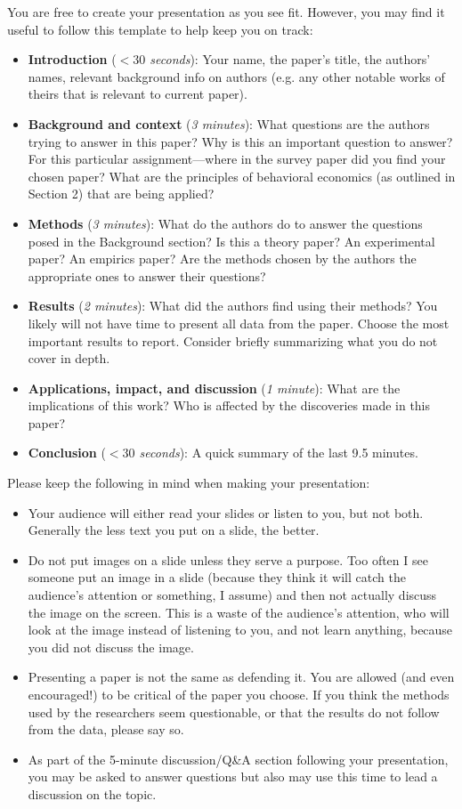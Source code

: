 \documentclass[11pt]{article}
\begin{document}
You are free to create your presentation as you see fit. However, you may find it useful to follow this template to help keep you on track:
\begin{itemize}
    \item {\bf Introduction} ({\it $<30$ seconds}): Your name, the paper's title, the authors' names, relevant background info on authors (e.g. any other notable works of theirs that is relevant to current paper).
    \item {\bf Background and context} ({\it 3 minutes}): What questions are the authors trying to answer in this paper? Why is this an important question to answer? For this particular assignment---where in the survey paper did you find your chosen paper? What are the principles of behavioral economics (as outlined in Section 2) that are being applied?
    \item {\bf Methods} ({\it 3 minutes}): What do the authors do to answer the questions posed in the Background section? Is this a theory paper? An experimental paper? An empirics paper? Are the methods chosen by the authors the appropriate ones to answer their questions? 
    \item {\bf Results} ({\it 2 minutes}): What did the authors find using their methods? You likely will not have time to present all data from the paper. Choose the most important results to report. Consider briefly summarizing what you do not cover in depth.
    \item {\bf Applications, impact, and discussion} ({\it 1 minute}): What are the implications of this work? Who is affected by the discoveries made in this paper?
    \item {\bf Conclusion} ({\it $<30$ seconds}): A quick summary of the last 9.5 minutes.
\end{itemize}

\noindent Please keep the following in mind when making your presentation:

\begin{itemize}
    \item Your audience will either read your slides or listen to you, but not both. Generally the less text you put on a slide, the better. 
    \item Do not put images on a slide unless they serve a purpose. Too often I see someone put an image in a slide (because they think it will catch the audience's attention or something, I assume) and then not actually discuss the image on the screen. This is a waste of the audience's attention, who will look at the image instead of listening to you, and not learn anything, because you did not discuss the image.
    \item Presenting a paper is not the same as defending it. You are allowed (and even encouraged!) to be critical of the paper you choose. If you think the methods used by the researchers seem questionable, or that the results do not follow from the data, please say so. 
    \item As part of the 5-minute discussion/Q\&A section following your presentation, you may be asked to answer questions but also may use this time to lead a discussion on the topic.
\end{itemize}
\end{document}
